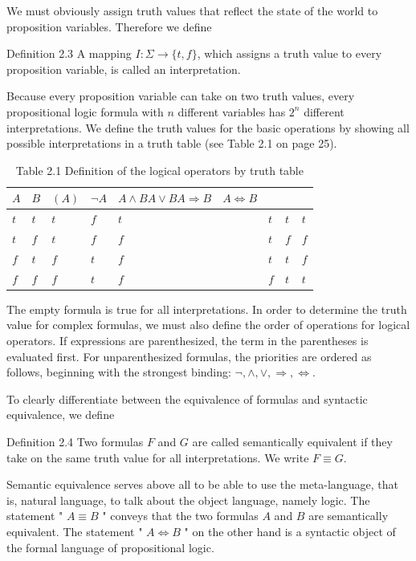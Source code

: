 \documentclass[10pt]{article}
\begin{document}
We must obviously assign truth values that reflect the state of the world to proposition variables. Therefore we define

Definition 2.3 A mapping $I: \Sigma \rightarrow\{t, f\}$, which assigns a truth value to every proposition variable, is called an interpretation.

Because every proposition variable can take on two truth values, every propositional logic formula with $n$ different variables has $2^{n}$ different interpretations. We define the truth values for the basic operations by showing all possible interpretations in a truth table (see Table 2.1 on page 25).

\begin{table}[h]
\begin{center}
\captionsetup{labelformat=empty}
\caption{Table 2.1 Definition of the logical operators by truth table}
\begin{tabular}{llllllll}
\hline
$A$ & $B$ & $(A)$ & $\neg A$ & $A \wedge B A \vee B A \Rightarrow B \quad A \Leftrightarrow B$ &  &  &  \\
\hline
$t$ & $t$ & $t$ & $f$ & $t$ & $t$ & $t$ & $t$ \\
\hline
$t$ & $f$ & $t$ & $f$ & $f$ & $t$ & $f$ & $f$ \\
\hline
$f$ & $t$ & $f$ & $t$ & $f$ & $t$ & $t$ & $f$ \\
\hline
$f$ & $f$ & $f$ & $t$ & $f$ & $f$ & $t$ & $t$ \\
\hline
\end{tabular}
\end{center}
\end{table}

The empty formula is true for all interpretations. In order to determine the truth value for complex formulas, we must also define the order of operations for logical operators. If expressions are parenthesized, the term in the parentheses is evaluated first. For unparenthesized formulas, the priorities are ordered as follows, beginning with the strongest binding: $\neg, \wedge, \vee, \Rightarrow, \Leftrightarrow$.

To clearly differentiate between the equivalence of formulas and syntactic equivalence, we define

Definition 2.4 Two formulas $F$ and $G$ are called semantically equivalent if they take on the same truth value for all interpretations. We write $F \equiv G$.

Semantic equivalence serves above all to be able to use the meta-language, that is, natural language, to talk about the object language, namely logic. The statement " $A \equiv B$ " conveys that the two formulas $A$ and $B$ are semantically equivalent. The statement " $A \Leftrightarrow B$ " on the other hand is a syntactic object of the formal language of propositional logic.
\end{document}
